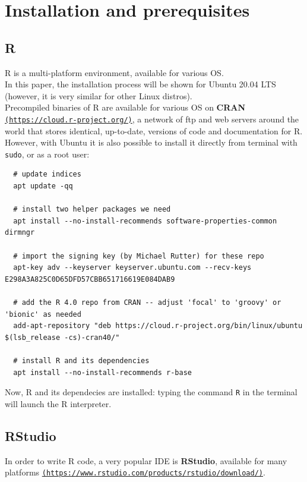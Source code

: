 \documentclass{article}
\begin{document}
\pagebreak

\section{Installation and prerequisites}
\subsection{R}
R is a multi-platform environment, available for various OS.\\
In this paper, the installation process will be shown for Ubuntu 20.04 LTS\\
(however, it is very similar for other Linux distros).\\

Precompiled binaries of R are available for various OS on \textbf{CRAN} \href{https://cloud.r-project.org/}{\texttt{(https://cloud.r-project.org/)}}, a network of ftp and web servers around the world that stores identical, up-to-date, versions of code and documentation for R.\\

However, with Ubuntu it is also possible to install it directly from terminal with \texttt{sudo}, or as a root user:\\

\begin{lstlisting}
  # update indices
  apt update -qq

  # install two helper packages we need
  apt install --no-install-recommends software-properties-common dirmngr

  # import the signing key (by Michael Rutter) for these repo
  apt-key adv --keyserver keyserver.ubuntu.com --recv-keys E298A3A825C0D65DFD57CBB651716619E084DAB9

  # add the R 4.0 repo from CRAN -- adjust 'focal' to 'groovy' or 'bionic' as needed
  add-apt-repository "deb https://cloud.r-project.org/bin/linux/ubuntu $(lsb_release -cs)-cran40/"

  # install R and its dependencies
  apt install --no-install-recommends r-base

\end{lstlisting}

\vspace{3mm}
Now, R and its dependecies are installed: typing the command \texttt{R} in the terminal will launch the R interpreter.\\

\subsection{RStudio}
In order to write R code, a very popular IDE is \textbf{RStudio}, available for many platforms \href{https://www.rstudio.com/products/rstudio/download/}{\texttt{(https://www.rstudio.com/products/rstudio/download/)}}.
\\
\end{document}
